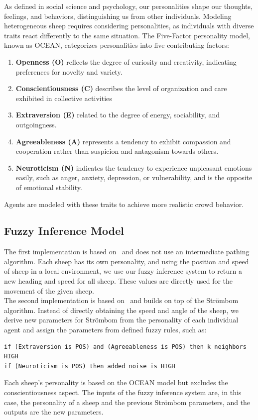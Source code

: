 \documentclass[9pt]{pnas-new}
\begin{document}
As defined in social science and psychology, our personalities shape our thoughts, feelings, and behaviors, distinguishing us from other individuals. Modeling heterogeneous sheep requires considering personalities, as individuals with diverse traits react differently to the same situation. The Five-Factor personality model, known as OCEAN, categorizes personalities into five contributing factors:
\begin{enumerate}
  \item \textbf{Openness (O)} reflects the degree of curiosity and creativity, indicating preferences for novelty and variety.
  \item \textbf{Conscientiousness (C)} describes the level of organization and care exhibited in collective activities
  \item \textbf{Extraversion (E)} related to the degree of energy, sociability, and outgoingness.
  \item \textbf{Agreeableness (A)} represents a tendency to exhibit compassion and cooperation rather than suspicion and antagonism towards others.
  \item \textbf{Neuroticism (N)} indicates the tendency to experience unpleasant emotions easily, such as anger, anxiety, depression, or vulnerability, and is the opposite of emotional stability.
\end{enumerate}
Agents are modeled with these traits to achieve more realistic crowd behavior.

\subsection*{Fuzzy Inference Model}
The first implementation is based on~\cite{bajec2003boids} and does not use an intermediate pathing algorithm. Each sheep has its own personality, and using the position and speed of sheep in a local environment, we use our fuzzy inference system to return a new heading and speed for all sheep. These values are directly used for the movement of the given sheep.\\
The second implementation is based on~\cite{fuzzylogic} and builds on top of the Str\"{o}mbom algorithm. Instead of directly obtaining the speed and angle of the sheep, we derive new parameters for Str\"{o}mbom from the personality of each individual agent and assign the parameters from defined fuzzy rules, such as:
\begin{verbatim}    
if (Extraversion is POS) and (Agreeableness is POS) then k neighbors HIGH
if (Neuroticism is POS) then added noise is HIGH
\end{verbatim}
Each sheep's personality is based on the OCEAN model but excludes the conscientiousness aspect. The inputs of the fuzzy inference system are, in this case, the personality of a sheep and the previous Str\"{o}mbom parameters, and the outputs are the new parameters.  
\end{document}
